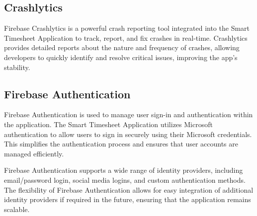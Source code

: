 \documentclass[
  digital,     %
  oneside,     %
  nosansbold,  %
  nocolorbold, %
  lof,         %
  lot,         %
]{fithesis4}
\begin{document}
\subsection{Crashlytics}

Firebase Crashlytics is a powerful crash reporting tool integrated into the Smart Timesheet Application to track, report, and fix crashes in real-time. Crashlytics provides detailed reports about the nature and frequency of crashes, allowing developers to quickly identify and resolve critical issues, improving the app's stability.

\subsection{Firebase Authentication}

Firebase Authentication is used to manage user sign-in and authentication within the application. The Smart Timesheet Application utilizes Microsoft authentication to allow users to sign in securely using their Microsoft credentials. This simplifies the authentication process and ensures that user accounts are managed efficiently.

Firebase Authentication supports a wide range of identity providers, including email/password login, social media logins, and custom authentication methods. The flexibility of Firebase Authentication allows for easy integration of additional identity providers if required in the future, ensuring that the application remains scalable.

\shorthandoff{-}
\begin{markdown}
\end{markdown}
\shorthandon{-}
\end{document}
